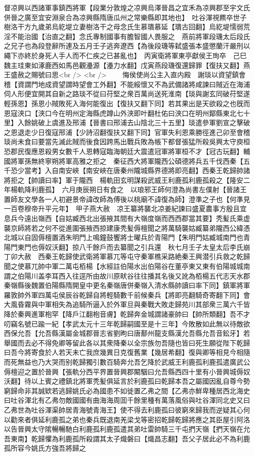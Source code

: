 督凉興以西諸軍事鎮西將軍【段業分敦煌之凉興烏澤晉昌之宜禾為凉興郡至宇文氏併晉之廣至宜安淵泉合為凉興縣隋唐瓜州之常樂縣即其地也】　吐谷渾視羆卒世子樹洛干方九歲弟烏紇堤立妻樹洛干之母念氏生慕璝慕延【璝古回翻】烏紇堤懦弱荒淫不能治國【治直之翻】念氏專制國事有膽智國人畏服之　燕前將軍段璣太后段氏之兄子也為段登辭所連及五月壬子逃奔遼西【為後段璣等弑盛張本盛懲蘭汗嚴刑以繩下亦終於身死人手人而不仁疾之已甚亂也】　丙寅衛將軍東亭獻侯王珣卒　己巳魏主珪東如涿鹿西如馬邑觀灅源【灅力水翻】戊寅燕段璣復還歸罪【復扶又翻】燕王盛赦之賜號曰思<br />
<br />
　　悔侯使尚公主入直内殿　謝琰以資望鎮會稽【資謂門地成資望謂時望會工外翻】不能綏懷又不為武備諸將咸諫曰賊近在海浦伺人形便宜開其自新之路琰不從曰苻堅之衆百萬尚送死淮南【琰與謝玄同破苻堅遂輕孫恩】孫恩小賊敗死入海何能復出【復扶又翻下同】若其果出是天欲殺之也旣而恩寇浹口【浹口今在明州定海縣虎蹲山外浹即叶翻杜佑曰浹口在明州鄮縣東北七十里】入餘姚破上虞進及邢浦【晉書曰邢浦去山陰北三十五里】琰遣參軍劉宣之擊破之恩退走少日復寇邢浦【少詩沼翻復扶又翻下同】官軍失利恩乘勝徑進己卯至會稽琰尚未食曰要當先滅此賊而後食因跨馬出戰兵敗為帳下都督張猛所殺吳興太守庾桓恐郡民復應恩殺男女數千人恩轉寇臨海朝廷大震遣冠軍將軍桓不才【冠古玩翻】輔國將軍孫無終寧朔將軍高雅之拒之　秦征西大將軍隴西公碩德將兵五千伐西秦【五千恐少當考】入自南安峽【南安峽在唐秦州隴城縣界德將即亮翻】西秦王乾歸帥諸將拒之【帥讀曰率】軍于隴西　楊軌田玄明謀殺武威王利鹿孤利鹿孤殺之【隆安二年楊軌降利鹿孤】　六月庚辰朔日有食之　以琅邪王師何澄為尚書左僕射【晉諸王置師友文學各一人初避景帝諱改師為傅後以桃廟不諱復為師】澄準之子也【何準見一百卷穆帝升平元年】　甲子燕大赦　凉王纂將襲北凉姜紀諫曰盛夏農事方殷且宜息兵今遠出嶺西【自姑臧西北出張掖其間有大嶺度嶺而西西郡當其要】秃髪氏乘虚襲京師將若之何不從進圍張掖西掠建康秃髪傉檀聞之將萬騎襲姑臧纂弟隴西公緯憑北城以自固傉檀置酒朱明門上鳴鐘鼓饗將士曜兵於青陽門【朱明門姑臧城南門也青陽門東門也傉奴沃翻】掠八千餘戶而去纂聞之引兵還　秋七月壬子太皇太后李氏崩　丁卯大赦　西秦王乾歸使武衛將軍慕兀等屯守秦軍樵采路絶秦王興潜引兵救之乾歸聞之使慕兀帥中軍二萬屯栢楊【水經註伯陽水出伯陽谷在董亭東又東有伯陽城城南謂之伯陽川盖李耳西入往逕所由故川原畎谷往往播其名後又訛為栢楊五代志天水郡秦嶺縣後魏置伯陽縣隋開皇中更名秦嶺唐併秦嶺入清水縣帥讀曰率下同】鎮軍將軍羅敦帥外軍四萬屯侯辰谷乾歸自將輕騎數千前候秦兵【將即亮翻騎奇寄翻下同】會大風昏霧與中軍相失為追騎所逼入於外軍旦與秦戰大敗走歸苑川其部衆三萬六千皆降於秦興進軍枹罕【降戶江翻枹音膚】乾歸奔金城謂諸豪帥曰【帥所類翻】吾不才叨竊名號已踰一紀【孝武太元十三年乾歸嗣國至是十三年】今敗散如此無以待敵欲西保允吾【允吾縣漢屬金城郡晉志省劉昫曰唐鄯州龍支縣漢允吾縣允吾音鈆牙】若舉國而去必不得免卿等留此各以其衆降秦以全宗族勿吾隨也皆曰死生願從陛下乾歸曰吾今將寄食於人若天未亡我庶幾異日克復舊業【幾居希翻】復與卿等相見今相隨而死無益也乃大哭而别乾歸獨引數百騎奔允吾乞降於武威王利鹿孤利鹿孤遣廣武公傉檀迎之置於晉興【張軌分西平界置晉興郡闞駰曰允吾縣西四十里有小晉興城傉奴沃翻】待以上賓之禮鎮北將軍秃髪俱延言於利鹿孤曰乾歸本吾之屬國因亂自尊今勢窮歸命非其誠欵若逃歸姚氏必為國患不如徙置乙弗之間【乙弗亦鮮卑種居西北海史曰吐谷渾北有乙弗勿敵國國有曲海海周囬千餘里種有萬落風俗與吐谷渾同北史又曰乙弗世為吐谷渾渠帥居青海號青海王】使不得去利鹿孤曰彼窮來歸我而逆疑其心何以勸來者俱延利鹿孤之弟也秦兵既退南羌梁戈等密招乾歸乾歸將應之其臣屋引阿洛以告晉興太守隂暢暢馳白利鹿孤利鹿孤遣其弟吐雷帥騎三千屯捫天嶺【捫天嶺在允吾東南】乾歸懼為利鹿孤所殺謂其太子熾磐曰【熾昌志翻】吾父子居此必不為利鹿孤所容今姚氏方強吾將歸之